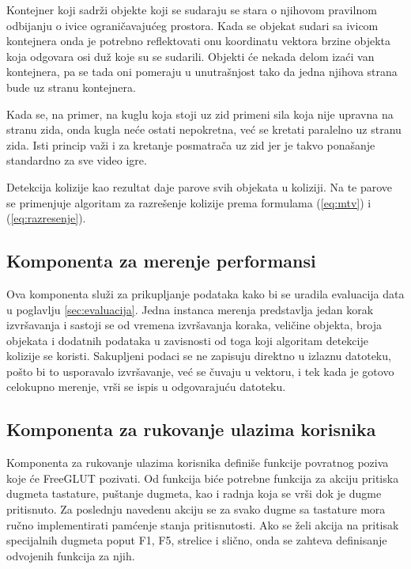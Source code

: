 \documentclass[12pt,oneside]{memoir}
\begin{document}
Kontejner koji sadrži objekte koji se sudaraju se stara o njihovom pravilnom odbijanju o ivice ograničavajućeg prostora.
Kada se objekat sudari sa ivicom kontejnera onda je potrebno reflektovati onu koordinatu vektora
brzine objekta koja odgovara osi duž koje su se sudarili.
Objekti će nekada delom izaći van kontejnera, pa se tada oni pomeraju u unutrašnjost tako da jedna njihova strana bude uz stranu kontejnera.

Kada se, na primer, na kuglu koja stoji uz zid primeni sila koja nije upravna na stranu zida, onda kugla neće ostati nepokretna,
već se kretati paralelno uz stranu zida. Isti princip važi i za kretanje posmatrača uz zid jer je 
takvo ponašanje standardno za sve video igre.

Detekcija kolizije kao rezultat daje parove svih objekata u koliziji. 
Na te parove se primenjuje algoritam za razrešenje kolizije prema formulama (\ref{eq:mtv}) i (\ref{eq:razresenje}).

\subsection{Komponenta za merenje performansi}
\label{sec:perf}

Ova komponenta služi za prikupljanje podataka kako bi se uradila evaluacija data u poglavlju \ref{sec:evaluacija}.
Jedna instanca merenja predstavlja jedan korak izvršavanja i sastoji se od 
vremena izvršavanja koraka, veličine objekta, broja objekata i dodatnih podataka u zavisnosti od toga 
koji algoritam detekcije kolizije se koristi. 
Sakupljeni podaci se ne zapisuju direktno u izlaznu datoteku, pošto bi 
to usporavalo izvršavanje, već se čuvaju u vektoru, 
i tek kada je gotovo celokupno merenje, vrši se ispis u odgovarajuću datoteku.

\subsection{Komponenta za rukovanje ulazima korisnika}

Komponenta za rukovanje ulazima korisnika definiše funkcije povratnog poziva koje će FreeGLUT pozivati.
Od funkcija biće potrebne funkcija za akciju pritiska dugmeta tastature, puštanje dugmeta, kao i 
radnja koja se vrši dok je dugme pritisnuto. 
Za poslednju navedenu akciju se za svako dugme sa tastature mora ručno implementirati pamćenje stanja pritisnutosti.
Ako se želi akcija na pritisak specijalnih dugmeta  
poput F1, F5, strelice i slično, onda se zahteva definisanje odvojenih funkcija za njih.
\end{document}
